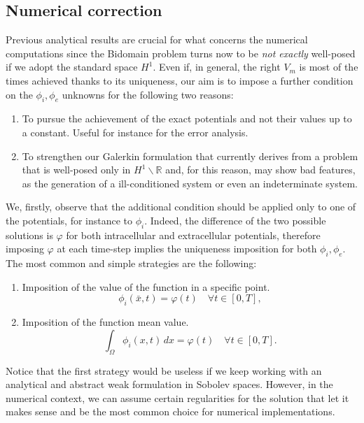 \documentclass[a4paper,11pt]{article}
\begin{document}
\subsection{Numerical correction} \label{imposition_section}
Previous analytical results are crucial for what concerns the numerical computations since the Bidomain problem turns now to be \emph{not exactly} well-posed if we adopt the standard space $H^1$. Even if, in general, the right $V_m$ is most of the times achieved thanks to its uniqueness, our aim is to impose a further condition on the $\phi_i,\phi_e$ unknowns for the following two reasons:
\begin{enumerate}
	\item To pursue the achievement of the exact potentials and not their values up to a constant. Useful for instance for the error analysis.
	\item To strengthen our Galerkin formulation that currently derives from a problem that is well-posed only in $H^1\backslash \mathbb{R}$ and, for this reason, may show bad features, as the generation of a ill-conditioned system or even an indeterminate system.
\end{enumerate}

\vspace{3mm}
\noindent We, firstly, observe that the additional condition should be applied only to one of the potentials, for instance to $\phi_i$. Indeed, the difference of the two possible solutions is $\varphi$ for both intracellular and extracellular potentials, therefore imposing $\varphi$ at each time-step implies the uniqueness imposition for both $\phi_i,\phi_e$. \\

\noindent The most common and simple strategies are the following:
\begin{enumerate}
	\item Imposition of the value of the function in a specific point.
	\begin{equation*}
	\phi_i(\bar{x},t) = \varphi(t) \quad \forall t \in [0,T],
	\end{equation*}
	\item Imposition of the function mean value.
	\begin{equation*}
	\int_\Omega \phi_i(x,t)\,dx = \varphi(t) \quad \forall t \in [0,T].
	\end{equation*}
\end{enumerate}

\noindent Notice that the first strategy would be useless if we keep working with an analytical and abstract weak formulation in Sobolev spaces. However, in the numerical context, we can assume certain regularities for the solution that let it makes sense and be the most common choice for numerical implementations. \\
\end{document}
